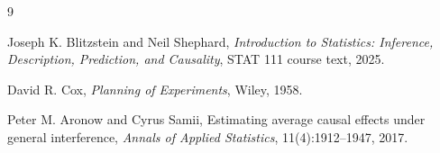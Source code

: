 \documentclass[11pt]{article}
\begin{document}
\begin{thebibliography}{9}

Joseph K. Blitzstein and Neil Shephard,
\textit{Introduction to Statistics: Inference, Description, Prediction, and Causality},
STAT 111 course text, 2025.

David R. Cox,
\textit{Planning of Experiments},
Wiley, 1958.

Peter M. Aronow and Cyrus Samii,
Estimating average causal effects under general interference,
\textit{Annals of Applied Statistics}, 11(4):1912--1947, 2017.

\end{thebibliography}
\end{document}
